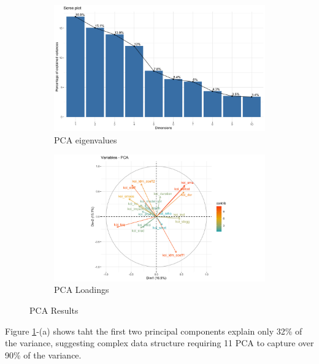 \begin{figure}[H]
    \centering
    \begin{subfigure}[b]{0.49\textwidth}
        \includegraphics[width=\textwidth]{Immagini/PCA_res.png}
        \caption{PCA eigenvalues}
    \end{subfigure}
    \begin{subfigure}[b]{0.49\textwidth}
        \includegraphics[width=\textwidth]{Immagini/PCA_torta.png}
        \caption{PCA Loadings}
    \end{subfigure}
    \caption{PCA Results}
    \label{fig:pca_plots}
\end{figure}

Figure \ref{fig:pca_plots}-(a) shows taht the first two principal components explain only 32\% of the variance, suggesting complex data structure requiring 11 PCA to capture over 90\% of the variance.

